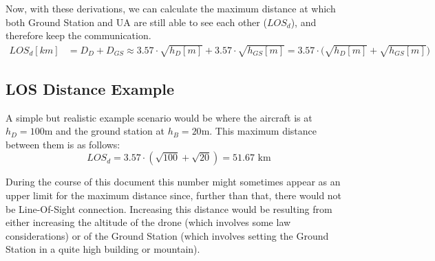 Now, with these derivations, we can calculate the maximum distance at which both Ground Station and UA are still able to see each other ($LOS_{d}$), and therefore keep the communication.
\begin{align}
	LOS_d[km]	 &= D_D + D_{GS} \approx 3.57\cdot \sqrt{h_D[m]} + 3.57\cdot \sqrt{h_{GS}[m]} = {3.57\cdot (\sqrt{h_D[m]} + \sqrt{h_{GS}[m]}} )
\end{align}

\subsection*{LOS Distance Example}
A simple but realistic example scenario would be where the aircraft is at $h_D = 100$m and the ground station at $h_B = 20$m. This maximum distance between them is as follows:
\begin{equation*}
	LOS_d = 3.57\cdot (\sqrt{100} + \sqrt{20}) = 51.67 \text{ km}
\end{equation*}

During the course of this document this number might sometimes appear as an upper limit for the maximum distance since, further than that, there would not be Line-Of-Sight connection. Increasing this distance would be resulting from either increasing the altitude of the drone (which involves some law considerations) or of the Ground Station (which involves setting the Ground Station in a quite high building or mountain).




